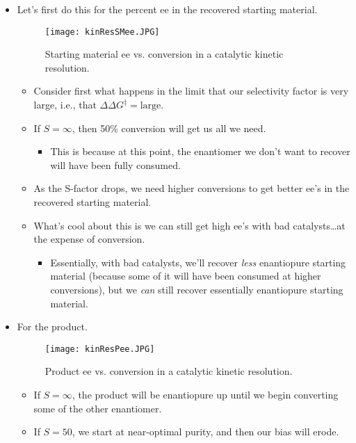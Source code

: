 \documentclass[../notes.tex]{subfiles}
\begin{document}
\begin{itemize}
    \item Let's first do this for the percent ee in the recovered starting material.
    \begin{figure}[H]
        \centering
        \texttt{[image: kinResSMee.JPG]}
        \caption{Starting material ee vs. conversion in a catalytic kinetic resolution.}
        \label{fig:kinResSMee}
    \end{figure}
    \begin{itemize}
        \item Consider first what happens in the limit that our selectivity factor is very large, i.e., that $\Delta\Delta G^\ddagger=\text{large}$.
        \item If $S=\infty$, then 50\% conversion will get us all we need.
        \begin{itemize}
            \item This is because at this point, the enantiomer we don't want to recover will have been fully consumed.
        \end{itemize}
        \item As the S-factor drops, we need higher conversions to get better ee's in the recovered starting material.
        \item What's cool about this is we can still get high ee's with bad catalysts\dots at the expense of conversion.
        \begin{itemize}
            \item Essentially, with bad catalysts, we'll recover \emph{less} enantiopure starting material (because some of it will have been consumed at higher conversions), but we \emph{can} still recover essentially enantiopure starting material.
        \end{itemize}
    \end{itemize}
    \item For the product.
    \begin{figure}[h!]
        \centering
        \texttt{[image: kinResPee.JPG]}
        \caption{Product ee vs. conversion in a catalytic kinetic resolution.}
        \label{fig:kinResPee}
    \end{figure}
    \begin{itemize}
        \item If $S=\infty$, the product will be enantiopure up until we begin converting some of the other enantiomer.
        \item If $S=50$, we start at near-optimal purity, and then our bias will erode.

\end{itemize}
\end{itemize}
\end{document}
